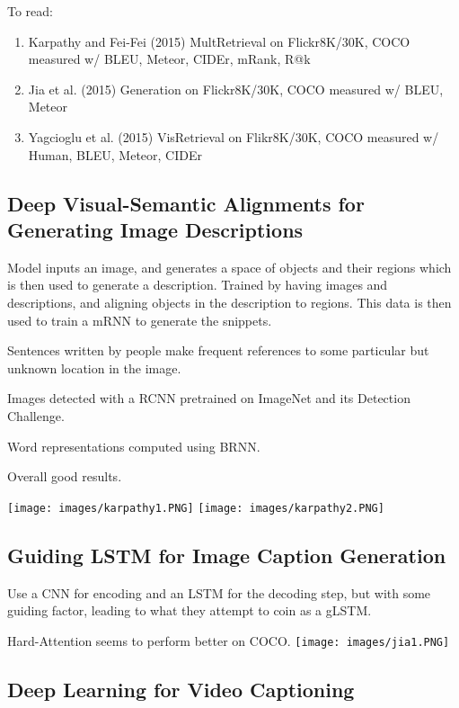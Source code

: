 \documentclass[conference]{IEEEtran}
\begin{document}
To read:
\begin{enumerate}
    \item Karpathy and Fei-Fei (2015) MultRetrieval on Flickr8K/30K, COCO measured w/ BLEU, Meteor, CIDEr, mRank, R@k
    \item Jia et al. (2015) Generation on Flickr8K/30K, COCO measured w/ BLEU, Meteor
    \item Yagcioglu et al. (2015) VisRetrieval on Flikr8K/30K, COCO measured w/ Human, BLEU, Meteor, CIDEr
\end{enumerate}
\cite{bernardi2016automatic}

\subsection{Deep Visual-Semantic Alignments for Generating Image Descriptions}

Model inputs an image, and generates a space of objects and their regions which is then used to generate a description. Trained by having images and descriptions, and aligning objects in the description to regions. This data is then used to train a mRNN to generate the snippets.

Sentences written by people make frequent references to some particular but unknown location in the image.

Images detected with a RCNN pretrained on ImageNet and its Detection Challenge.

Word representations computed using BRNN.

Overall good results.

\texttt{[image: images/karpathy1.PNG]}
\texttt{[image: images/karpathy2.PNG]}

\cite{karpathy2015deep}

\subsection{Guiding LSTM for Image Caption Generation}
Use a CNN for encoding and an LSTM for the decoding step, but with some guiding factor, leading to what they attempt to coin as a gLSTM.

Hard-Attention seems to perform better on COCO.
\texttt{[image: images/jia1.PNG]}

\cite{jia2015guiding}

\subsection{Deep Learning for Video Captioning}
\end{document}
